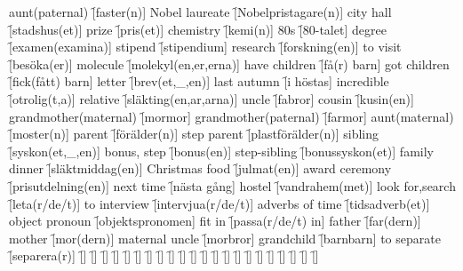 \begin{questions}
    \begin{multicols}{2}
        \raggedcolumns
        \question aunt(paternal) \f[faster(n)]
        \question Nobel laureate \f[Nobelpristagare(n)]
        \question city hall \f[stadshus(et)]
        \question prize \f[pris(et)]
        \question chemistry \f[kemi(n)]
        \question 80s \f[80-talet]
        \question degree \f[examen(examina)]
        \question stipend \f[stipendium]
        \question research \f[forskning(en)]
        \question to visit \f[besöka(er)]
        \question molecule \f[molekyl(en,er,erna)]
        \question have children \f[få(r) barn]
        \question got children \f[fick(fått) barn]
        \question letter \f[brev(et,\_,en)]
        \question last autumn \f[i höstas]
        \question incredible \f[otrolig(t,a)]
        \question relative \f[släkting(en,ar,arna)]
        \question uncle \f[fabror]
        \question cousin \f[kusin(en)]
        \question grandmother(maternal) \f[mormor]
        \question grandmother(paternal) \f[farmor]
        \question aunt(maternal) \f[moster(n)]
        \question parent \f[förälder(n)]
        \question step parent \f[plastförälder(n)]
        \question sibling \f[syskon(et,\_,en)]
        \question bonus, step \f[bonus(en)]
        \question step-sibling \f[bonussyskon(et)]
        \question family dinner \f[släktmiddag(en)]
        \question Christmas food \f[julmat(en)]
        \question award ceremony \f[prisutdelning(en)]
        \question next time \f[nästa gång]
        \question hostel \f[vandrahem(met)]
        \question look for,search \f[leta(r/de/t)]
        \question to interview \f[intervjua(r/de/t)]
        \question adverbs of time \f[tidsadverb(et)]
        \question object pronoun \f[objektspronomen]
        \question fit in \f[passa(r/de/t) in]
        \question father \f[far(dern)]
        \question mother \f[mor(dern)]
        \question maternal uncle \f[morbror]
        \question grandchild \f[barnbarn]
        \question to separate \f[separera(r)]
        \question  \f[]
        \question  \f[]
        \question  \f[]
        \question  \f[]
        \question  \f[]
        \question  \f[]
        \question  \f[]
        \question  \f[]
        \question  \f[]
        \question  \f[]
        \question  \f[]
        \question  \f[]
        \question  \f[]
        \question  \f[]
        \question  \f[]
        \question  \f[]
        \question  \f[]
        \question  \f[]
        \question  \f[]
        \question  \f[]
        \question  \f[]
        \question  \f[]

\end{multicols}
\end{questions}

